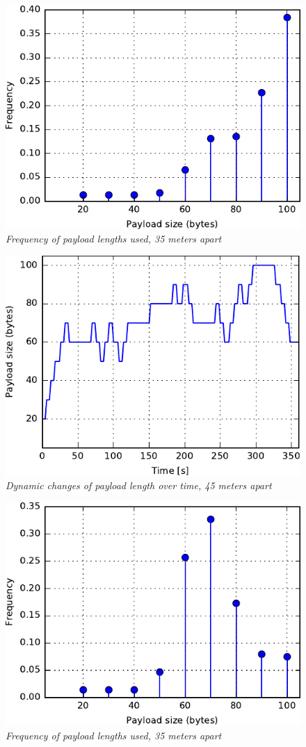 \begin{figure}
\centering
\includegraphics[scale=1]{figs/35mHist.pdf} 
\caption{\textit{Frequency of payload lengths used, 35 meters apart}\label{fig:35mHist}}
\end{figure}
\begin{figure}
\centering
\includegraphics[scale=1]{figs/45mDPLC.pdf} 
\caption{\textit{Dynamic changes of payload length over time, 45 meters apart}\label{fig:45mDPLC}}
\end{figure}
\begin{figure}
\centering
\includegraphics[scale=1]{figs/45mHist.pdf} 
\caption{\textit{Frequency of payload lengths used, 35 meters apart}\label{fig:45mHist}}
\end{figure}